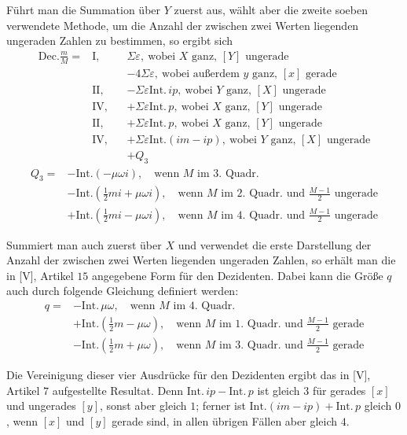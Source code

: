 Führt man die Summation über $Y$ zuerst aus, wählt aber die zweite soeben verwendete Methode, um die Anzahl der zwischen zwei Werten liegenden ungeraden Zahlen zu bestimmen, so ergibt sich
\[
\begin{aligned}
\mathrm{Dec.}\frac mM={}&\mathrm{I},& &\Sigma\varepsilon,\ \text{wobei }X\text{ ganz, }[Y]\text{ ungerade}\\
&&&-4\Sigma\varepsilon,\ \text{wobei außerdem }y\text{ ganz, }[x]\text{ gerade}\\
&\mathrm{II},&&-\Sigma\varepsilon\mathrm{Int.}\,ip,\ \text{wobei }Y\text{ ganz, }[X]\text{ ungerade}\\
&\mathrm{IV},&&+\Sigma\varepsilon\mathrm{Int.}\,p,\ \text{wobei }X\text{ ganz, }[Y]\text{ ungerade}\\
&\mathrm{II},&&+\Sigma\varepsilon\mathrm{Int.}\,p,\ \text{wobei }X\text{ ganz, }[Y]\text{ ungerade}\\
&\mathrm{IV},&&+\Sigma\varepsilon\mathrm{Int.}(im-ip),\ \text{wobei }Y\text{ ganz, }[X]\text{ ungerade}\\
&&&+Q_3
\end{aligned}
\]
\[
\begin{aligned}
Q_3={}&-\mathrm{Int.}(-\mu\omega i),\quad\text{wenn }M\text{ im }3.\text{ Quadr.}\\
&-\mathrm{Int.}(\tfrac12mi+\mu\omega i),\quad\text{wenn }M\text{ im }2.\text{ Quadr. und }\frac{M-1}{2}\text{ ungerade}\\
&+\mathrm{Int.}(\tfrac12mi-\mu\omega i),\quad\text{wenn }M\text{ im }4.\text{ Quadr. und }\frac{M-1}{2}\text{ ungerade}
\end{aligned}
\]

Summiert man auch zuerst über $X$ und verwendet die erste Darstellung der Anzahl der zwischen zwei Werten liegenden ungeraden Zahlen, so erhält man die in [V], Artikel $15$ angegebene Form für den Dezidenten. Dabei kann die Größe $q$ auch durch folgende Gleichung definiert werden:
\[
\begin{aligned}
q={}&-\mathrm{Int.}\,\mu\omega,\quad\text{wenn }M\text{ im }4.\text{ Quadr.}\\
&+\mathrm{Int.}(\tfrac12m-\mu\omega),\quad\text{wenn }M\text{ im }1.\text{ Quadr. und }\frac{M-1}{2}\text{ gerade}\\
&-\mathrm{Int.}(\tfrac12m+\mu\omega),\quad\text{wenn }M\text{ im }3.\text{ Quadr. und }\frac{M-1}{2}\text{ gerade}
\end{aligned}
\]

Die Vereinigung dieser vier Ausdrücke für den Dezidenten ergibt das in [V], Artikel $7$ aufgestellte Resultat. Denn $\mathrm{Int.}\,ip-\mathrm{Int.}\,p$ ist gleich $3$ für gerades $[x]$ und ungerades $[y]$, sonst aber gleich $1$; ferner ist $\mathrm{Int.}(im-ip)+\mathrm{Int.}\,p$ gleich $0$, wenn $[x]$ und $[y]$ gerade sind, in allen übrigen Fällen aber gleich $4$.

